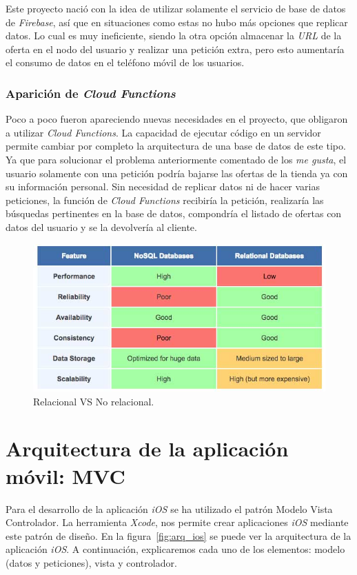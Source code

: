 Este proyecto nació con la idea de utilizar solamente el servicio de base de datos de \textit{Firebase}, así que en situaciones como estas no hubo más opciones que replicar datos. Lo cual es muy ineficiente, siendo la otra opción almacenar la \textit{URL} de la oferta en el nodo del usuario y realizar una petición extra, pero esto aumentaría el consumo de datos en el teléfono móvil de los usuarios.

\subsubsection*{Aparición de \textit{Cloud Functions}}
Poco a poco fueron apareciendo nuevas necesidades en el proyecto, que obligaron a utilizar \textit{Cloud Functions}. La capacidad de ejecutar código en un servidor permite cambiar por completo la arquitectura de una base de datos de este tipo. Ya que para solucionar el problema anteriormente comentado de los \textit{me gusta}, el usuario solamente con una petición podría bajarse las ofertas de la tienda ya con su información personal. Sin necesidad de replicar datos ni de hacer varias peticiones, la función de \textit{Cloud Functions} recibiría la petición, realizaría las búsquedas pertinentes en la base de datos, compondría el listado de ofertas con datos del usuario y se la devolvería al cliente.

\begin{figure}[tbp]
\centering
\includegraphics[scale=0.5]{figures/nosqlVS.jpg}
\caption{Relacional VS No relacional.\label{fig:nosqlVS}}
\end{figure}

\section{Arquitectura de la aplicación móvil: MVC}
Para el desarrollo de la aplicación \textit{iOS} se ha utilizado el patrón Modelo Vista Controlador. La herramienta \textit{Xcode}, nos permite crear aplicaciones \textit{iOS} mediante este patrón de diseño.
En la figura~\ref{fig:arq_ios} se puede ver la arquitectura de la aplicación \emph{iOS}. A continuación, explicaremos cada uno de los elementos: modelo (datos y peticiones), vista y controlador. 

